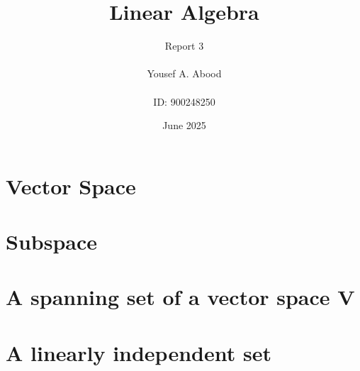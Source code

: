 \documentclass[a4paper,12pt]{article}
\title{Linear Algebra}
\author{Report 3\\ \\ Yousef A. Abood\\ \\ ID: 900248250}
\date{June 2025}
\begin{document}
\maketitle
\noindent\makebox[\linewidth]{\rule{15cm}{0.4pt}}
\section{Vector Space}
\section{Subspace}
\section{A spanning set of a vector space V}
\section{A linearly independent set}
\end{document}
